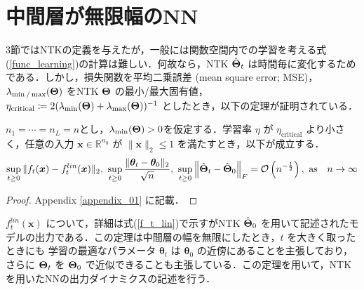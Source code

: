 \section{中間層が無限幅のNN}
\label{infinite_width}
3節ではNTKの定義を与えたが，一般には関数空間内での学習を考える式(\ref{func_learning})の計算は難しい．何故なら，NTK $\hat{\bm{\Theta}}_t$ は時間毎に変化するためである．しかし，損失関数を平均二乗誤差 (mean square error; MSE)，$\lambda_{\min/\max}(\bm{\Theta})$ をNTK $\bm{\Theta}$ の最小/最大固有値，$\eta_{\text{critical}} \coloneqq 2(\lambda_{\min}(\bm{\Theta})+\lambda_{\max}(\bm{\Theta}))^{-1}$ としたとき，以下の定理が証明されている．
\begin{thm}
\label{statement_ntk}
    $n_1 = \cdots = n_L = n$とし，$\lambda_{\min}(\bm{\Theta}) > 0$を仮定する．学習率 $\eta$ が $\eta_{\text{critical}}$ より小さく，任意の入力 $\bm{x} \in \mathbb{R}^{n_0}$ が $\|\bm{x}\|_2 \leq 1$ を満たすとき，以下が成立する．
    \begin{align*}
        \sup_{t \geq 0} \|f_t(\bm{x}) - f_t^{lin}(\bm{x})\|_2, \ \sup_{t \geq 0} \dfrac{\|\bm{\theta}_t - \bm{\theta}_0\|_2}{\sqrt{n}}, \ \sup_{t \geq 0}\left\|\hat{\bm{\Theta}}_t - \hat{\bm{\Theta}}_0\right\|_F = \mathcal{O}\left(n^{-\frac{1}{2}}\right), \ \mbox{as} \quad n \rightarrow \infty
    \end{align*}
\end{thm}
\begin{proof}
    Appendix \ref{appendix_01} に記載．
\end{proof}
\par
\noindent
$f_t^{lin}(\bm{x})$ について，詳細は式(\ref{f_t_lin})で示すがNTK $\hat{\bm{\Theta}}_0$ を用いて記述されたモデルの出力である．この定理は中間層の幅を無限にしたとき，$t$ を大きく取ったときにも 学習の最適なパラメータ $\bm{\theta}_t$ は $\bm{\theta}_0$ の近傍にあることを主張しており，さらに $\bm{\Theta}_t$ を $\bm{\Theta}_0$ で近似できることも主張している．この定理を用いて，NTKを用いたNNの出力ダイナミクスの記述を行う．